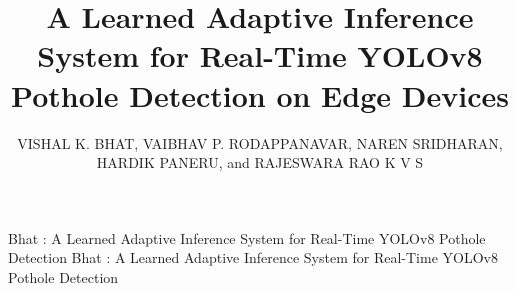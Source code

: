 \documentclass{ieeeaccess}
\begin{document}

\title{A Learned Adaptive Inference System for Real-Time YOLOv8 Pothole Detection on Edge Devices}

\author{
\uppercase{Vishal K. Bhat},
\uppercase{Vaibhav P. Rodappanavar},
\uppercase{Naren Sridharan},
\uppercase{Hardik Paneru}, and
\uppercase{Rajeswara Rao K V S}}

\address[1]{Department of Computer Science, RV College of Engineering, Bengaluru, Karnataka 560059, India (e-mail: vishalkbhat.cs23@rvce.edu.in; vaibhavpr.cs23@rvce.edu.in)}
\address[2]{Department of Electronics and Communication Engineering, RV College of Engineering, Bengaluru, Karnataka 560059, India (e-mail: narensridharan.ec23@rvce.edu.in; hardikpaneru.ec23@rvce.edu.in)}
\address[3]{Department of Industrial Engineering \& Management, RV College of Engineering, Bengaluru, Karnataka 560059, India (e-mail: rajeswararaokvs@rvce.edu.in)}


\markboth
{Bhat \headeretal: A Learned Adaptive Inference System for Real-Time YOLOv8 Pothole Detection}
{Bhat \headeretal: A Learned Adaptive Inference System for Real-Time YOLOv8 Pothole Detection}

\end{document}
